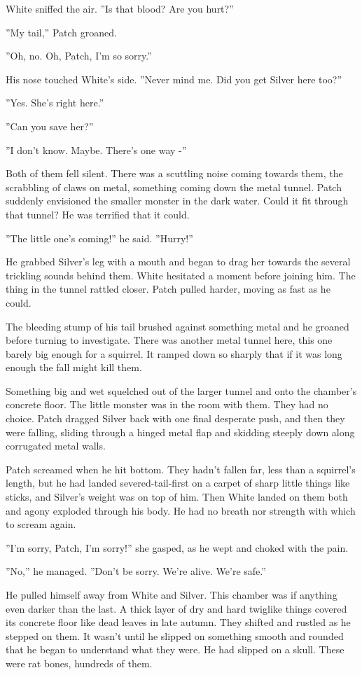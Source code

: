 \documentclass[12pt]{book}
\begin{document}
White sniffed the air. ''Is that blood? Are you hurt?''

''My tail,'' Patch groaned.

''Oh, no. Oh, Patch, I'm so sorry.''

His nose touched White's side. ''Never mind me. Did you get Silver here too?''

''Yes. She's right here.''

''Can you save her?''

''I don't know. Maybe. There's one way -''

Both of them fell silent. There was a scuttling noise coming towards them, the scrabbling of claws on metal, something coming down the metal tunnel. Patch suddenly envisioned the smaller monster in the dark water. Could it fit through that tunnel? He was terrified that it could.

''The little one's coming!'' he said. ''Hurry!''

He grabbed Silver's leg with a mouth and began to drag her towards the several trickling sounds behind them. White hesitated a moment before joining him. The thing in the tunnel rattled closer. Patch pulled harder, moving as fast as he could.

The bleeding stump of his tail brushed against something metal and he groaned before turning to investigate. There was another metal tunnel here, this one barely big enough for a squirrel. It ramped down so sharply that if it was long enough the fall might kill them.

Something big and wet squelched out of the larger tunnel and onto the chamber's concrete floor. The little monster was in the room with them. They had no choice. Patch dragged Silver back with one final desperate push, and then they were falling, sliding through a hinged metal flap and skidding steeply down along corrugated metal walls.

Patch screamed when he hit bottom. They hadn't fallen far, less than a squirrel's length, but he had landed severed-tail-first on a carpet of sharp little things like sticks, and Silver's weight was on top of him. Then White landed on them both and agony exploded through his body. He had no breath nor strength with which to scream again.

''I'm sorry, Patch, I'm sorry!'' she gasped, as he wept and choked with the pain.

''No,'' he managed. ''Don't be sorry. We're alive. We're safe.''

He pulled himself away from White and Silver. This chamber was if anything even darker than the last. A thick layer of dry and hard twiglike things covered its concrete floor like dead leaves in late autumn. They shifted and rustled as he stepped on them. It wasn't until he slipped on something smooth and rounded that he began to understand what they were. He had slipped on a skull. These were rat bones, hundreds of them.
\end{document}
